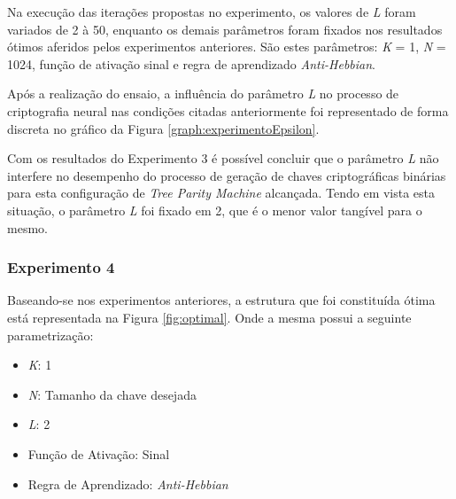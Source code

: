 \documentclass[a4paper,10pt,oneside,conference,final,keeplastbox]{inatel}
\begin{document}
                Na execução das iterações propostas no experimento, os valores de \textit{L} foram variados de 2 à 50, enquanto os demais parâmetros foram fixados nos resultados ótimos aferidos pelos experimentos anteriores. São estes parâmetros: \textit{K} = 1, \textit{N} = 1024, função de ativação sinal e regra de aprendizado \textit{Anti-Hebbian}.
                
                Após a realização do ensaio, a influência do parâmetro \textit{L} no processo de criptografia neural nas condições citadas anteriormente foi representado de forma discreta no gráfico da Figura \ref{graph:experimentoEpsilon}.

                
                
                Com os resultados do Experimento 3 é possível concluir que o parâmetro \textit{L} não interfere no desempenho do processo de geração de chaves criptográficas binárias para esta configuração de \textit{Tree Parity Machine} alcançada. Tendo em vista esta situação, o parâmetro \textit{L} foi fixado em 2, que é o menor valor tangível para o mesmo.
            
            \subsubsection{Experimento 4}
            \label{subsubsec:experimentoOmega}
            
                Baseando-se nos experimentos anteriores, a estrutura que foi constituída ótima está representada na Figura \ref{fig:optimal}. Onde a mesma possui a seguinte parametrização:
                
                \begin{itemize}
                    \item \textit{K}: 1
                    \item \textit{N}: Tamanho da chave desejada
                    \item \textit{L}: 2
                    \item Função de Ativação: Sinal
                    \item Regra de Aprendizado: \textit{Anti-Hebbian}
                \end{itemize}
                
                
                
\end{document}

